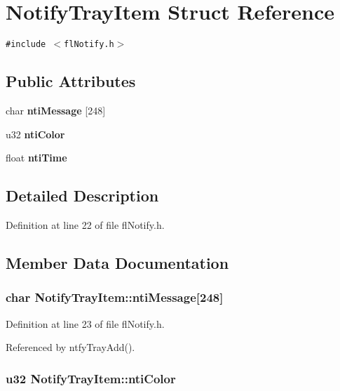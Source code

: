 \section{Notify\-Tray\-Item Struct Reference}
\label{structNotifyTrayItem}
{\tt \#include $<$fl\-Notify.h$>$}

\subsection*{Public Attributes}
\begin{CompactItemize}
\item 
char {\bf nti\-Message} [248]
\item 
u32 {\bf nti\-Color}
\item 
float {\bf nti\-Time}
\end{CompactItemize}


\subsection{Detailed Description}




Definition at line 22 of file fl\-Notify.h.

\subsection{Member Data Documentation}
\subsubsection{\setlength{\rightskip}{0pt plus 5cm}char {\bf Notify\-Tray\-Item::nti\-Message}[248]}\label{structNotifyTrayItem_924fceeab924637a846406aa94e5d933}




Definition at line 23 of file fl\-Notify.h.

Referenced by ntfy\-Tray\-Add().
\subsubsection{\setlength{\rightskip}{0pt plus 5cm}u32 {\bf Notify\-Tray\-Item::nti\-Color}}\label{structNotifyTrayItem_075a8e4871586a494b6f53c0a6aad98b}




